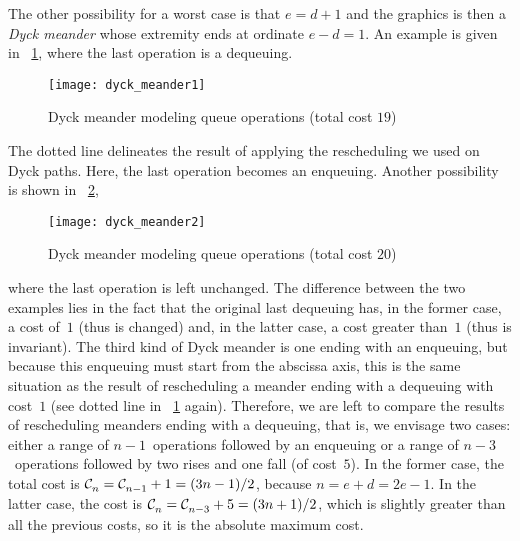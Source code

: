 \medskip

 The other possibility
for a worst case is that \(e = d + 1\) and the graphics is then a
\emph{Dyck meander} whose extremity ends at ordinate \(e-d=1\). An
example is given in \fig~\ref{fig:dyck_meander1}, where the last
operation is a dequeuing.
\begin{figure}[t]
\centering
\texttt{[image: dyck\_meander1]}
\caption{Dyck meander modeling queue operations (total cost
  \(19\))\label{fig:dyck_meander1}}
\end{figure}
The dotted line delineates the result of applying the rescheduling we
used on Dyck paths. Here, the last operation becomes an
enqueuing. Another possibility is shown in
\fig~\ref{fig:dyck_meander2},
\begin{figure}[b]
\centering
\texttt{[image: dyck\_meander2]}
\caption{Dyck meander modeling queue operations (total cost
  \(20\))\label{fig:dyck_meander2}}
\end{figure}
where the last operation is left unchanged. The difference between the
two examples lies in the fact that the original last dequeuing has, in
the former case, a cost of~\(1\) (thus is changed) and, in the latter
case, a cost greater than~\(1\) (thus is invariant). The third kind of
Dyck meander is one ending with an enqueuing, but because this
enqueuing must start from the abscissa axis, this is the same
situation as the result of rescheduling a meander ending with a
dequeuing with cost~\(1\) (see dotted line in
\fig~\ref{fig:dyck_meander1} again). Therefore, we are left to compare
the results of rescheduling meanders ending with a dequeuing, that is,
we envisage two cases: either a range of \(n-1\)~operations followed
by an enqueuing or a range of \(n-3\)~operations followed by two rises
and one fall (of cost~\(5\)). In the former case, the total cost is
\(\mathcal{C}_{n}^{}=\mathcal{C}_{n-1}^{}+1=(3n-1)/2\), because \(n=e+d=2e-1\). In the
latter case, the cost is \(\mathcal{C}_{n}^{}=\mathcal{C}_{n-3}^{}+5=(3n+1)/2\), which is
slightly greater than all the previous costs, so it is the absolute
maximum cost.
